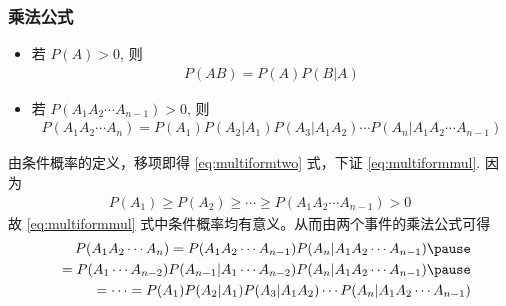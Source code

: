 \documentclass[Prob-All.tex]{subfiles}
\begin{document}
\begin{frame}
	\frametitle{乘法公式}
	\begin{thm}[乘法公式]
		\begin{itemize}[<+-|alert@+>]
			\item 若 $P (A)>0$, 则 %
			\begin{eqnarray}
				\label{eq:multiformtwo}
				P(AB)=P(A)P(B|A)
			\end{eqnarray}
			\item 若 $P (A_1A_2\cdots A_{n-1})>0$, 则
			\begin{eqnarray}
				\label{eq:multiformmul}
				P(A_1A_2\cdots A_n)=P(A_1)P(A_2|A_1)P(A_3|A_1A_2)\cdots P(A_n|A_1A_2\cdots A_{n-1})
			\end{eqnarray}

		\end{itemize}
	\end{thm}
	\pause \zheng  由条件概率的定义，移项即得 \eqref{eq:multiformtwo} 式，下证 \eqref{eq:multiformmul}. \pause 因为
	\begin{eqnarray*}
		P(A_1)\ge P(A_2)\ge\cdots\ge P(A_1A_2\cdots A_{n-1})>0
	\end{eqnarray*}
	故 \eqref{eq:multiformmul} 式中条件概率均有意义。从而由两个事件的乘法公式可得
	\pause \begin{eqnarray*}
		&&P(A_1A_2\cdots A_n)=P(A_1A_2\cdots A_{n-1})P(A_n|A_1A_2\cdots A_{n-1})\pause \\
		&&=P(A_1\cdots A_{n-2})P(A_{n-1}|A_1\cdots A_{n-2})P(A_n|A_1A_2\cdots A_{n-1})\pause \\
		&&=\cdots =P(A_1)P(A_2|A_1)P(A_3|A_1A_2)\cdots P(A_n|A_1A_2\cdots A_{n-1})
	\end{eqnarray*}

\end{frame}
\end{document}
